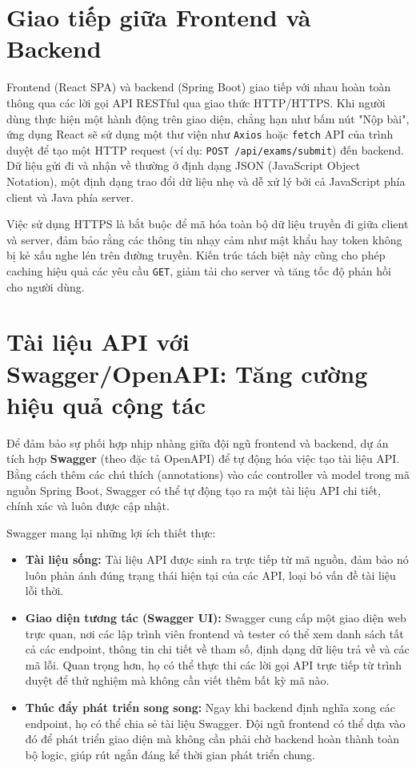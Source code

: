\documentclass[../DoAn.tex]{subfiles}
\begin{document}
\section{Giao tiếp giữa Frontend và Backend}

Frontend (React SPA) và backend (Spring Boot) giao tiếp với nhau hoàn toàn thông qua các lời gọi API RESTful qua giao thức HTTP/HTTPS. Khi người dùng thực hiện một hành động trên giao diện, chẳng hạn như bấm nút "Nộp bài", ứng dụng React sẽ sử dụng một thư viện như \texttt{Axios} hoặc \texttt{fetch} API của trình duyệt để tạo một HTTP request (ví dụ: \texttt{POST /api/exams/submit}) đến backend. Dữ liệu gửi đi và nhận về thường ở định dạng JSON (JavaScript Object Notation), một định dạng trao đổi dữ liệu nhẹ và dễ xử lý bởi cả JavaScript phía client và Java phía server.

Việc sử dụng HTTPS là bắt buộc để mã hóa toàn bộ dữ liệu truyền đi giữa client và server, đảm bảo rằng các thông tin nhạy cảm như mật khẩu hay token không bị kẻ xấu nghe lén trên đường truyền. Kiến trúc tách biệt này cũng cho phép caching hiệu quả các yêu cầu \texttt{GET}, giảm tải cho server và tăng tốc độ phản hồi cho người dùng.

\section{Tài liệu API với Swagger/OpenAPI: Tăng cường hiệu quả cộng tác}

Để đảm bảo sự phối hợp nhịp nhàng giữa đội ngũ frontend và backend, dự án tích hợp \textbf{Swagger} (theo đặc tả OpenAPI) để tự động hóa việc tạo tài liệu API. Bằng cách thêm các chú thích (annotations) vào các controller và model trong mã nguồn Spring Boot, Swagger có thể tự động tạo ra một tài liệu API chi tiết, chính xác và luôn được cập nhật.

Swagger mang lại những lợi ích thiết thực:
\begin{itemize}
    \item \textbf{Tài liệu sống:} Tài liệu API được sinh ra trực tiếp từ mã nguồn, đảm bảo nó luôn phản ánh đúng trạng thái hiện tại của các API, loại bỏ vấn đề tài liệu lỗi thời.
    \item \textbf{Giao diện tương tác (Swagger UI):} Swagger cung cấp một giao diện web trực quan, nơi các lập trình viên frontend và tester có thể xem danh sách tất cả các endpoint, thông tin chi tiết về tham số, định dạng dữ liệu trả về và các mã lỗi. Quan trọng hơn, họ có thể thực thi các lời gọi API trực tiếp từ trình duyệt để thử nghiệm mà không cần viết thêm bất kỳ mã nào.
    \item \textbf{Thúc đẩy phát triển song song:} Ngay khi backend định nghĩa xong các endpoint, họ có thể chia sẻ tài liệu Swagger. Đội ngũ frontend có thể dựa vào đó để phát triển giao diện mà không cần phải chờ backend hoàn thành toàn bộ logic, giúp rút ngắn đáng kể thời gian phát triển chung.
\end{itemize}
\end{document}
